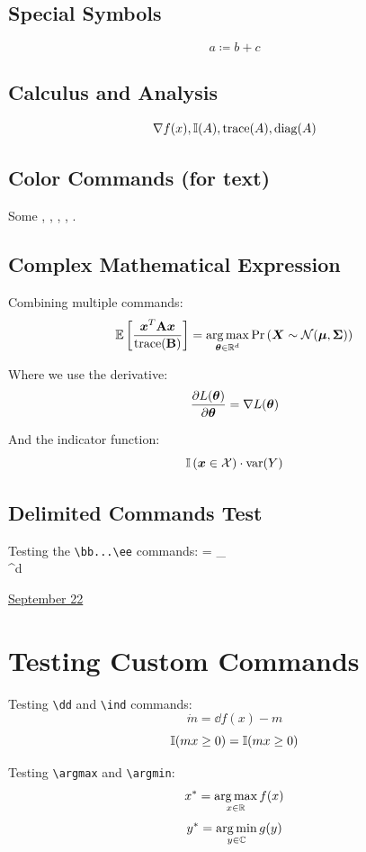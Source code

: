 \documentclass[letterpaper,11pt]{article}
\begin{document}
\subsection{Special Symbols}
$$a \coloneq b + c$$

\subsection{Calculus and Analysis}
$$\nabla f(x), \mathbb{I}(A), \mathrm{trace}(A), \mathrm{diag}(A)$$

\subsection{Color Commands (for text)}
Some , , , , .


\subsection{Complex Mathematical Expression}
Combining multiple commands:
$$\mathbb{E}\left[\frac{\displaystyle \boldsymbol{x}^T \mathbf{A} \boldsymbol{x}}{\displaystyle \mathrm{trace}(\mathbf{B})}\right] = \operatorname*{arg\,max}_{\boldsymbol{\theta} \in \mathbb{R}^d} \mathrm{Pr}\left(\boldsymbol{X} \sim \mathcal{N}(\boldsymbol{\mu}, \mathbf{\Sigma})\right)$$

Where we use the derivative:
$$\frac{\displaystyle \partial L(\boldsymbol{\theta})}{\displaystyle \partial \boldsymbol{\theta}} = \nabla L(\boldsymbol{\theta})$$

And the indicator function:
$$\mathbb{I}\left(\boldsymbol{x} \in \mathcal{X}\right) \cdot \mathrm{var}(Y)$$

\subsection{Delimited Commands Test}
Testing the \verb|\bb...\ee| commands:
\bb
{} = \argmax_{} \E{} \\
  \in \RR^d
\ee
\clearpage


\href{run:2025-09-22-test.tex}{\Huge September 22} 

\section{Testing Custom Commands}

Testing \verb|\dd| and \verb|\ind| commands:
$$\dot m = \dd f(x) - m$$
$$\mathbb{I}(mx \geq 0) = \mathbb{I}(mx \geq 0)$$

Testing \verb|\argmax| and \verb|\argmin|:
$$x^* = \operatorname*{arg\,max}_{x \in \mathbb{R}} f(x)$$
$$y^* = \operatorname*{arg\,min}_{y \in \mathbb{C}} g(y)$$
\end{document}
